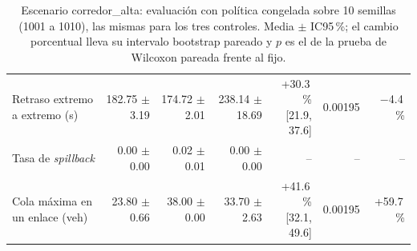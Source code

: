 \begin{table}[H]
\begin{tabular}{lrrrrrr}
Retraso extremo a extremo (s) & 182.75 $\pm$ 3.19 & 174.72 $\pm$ 2.01 & 238.14 $\pm$ 18.69 & \makecell{+30.3\,\%\\{}[21.9, 37.6]} & 0.00195 & $-$4.4\,\% \\
Tasa de \textit{spillback} & 0.00 $\pm$ 0.00 & 0.02 $\pm$ 0.01 & 0.00 $\pm$ 0.00 & -- & -- & -- \\
Cola máxima en un enlace (veh) & 23.80 $\pm$ 0.66 & 38.00 $\pm$ 0.00 & 33.70 $\pm$ 2.63 & \makecell{+41.6\,\%\\{}[32.1, 49.6]} & 0.00195 & +59.7\,\% \\
\bottomrule
\end{tabular}
\caption[Escenario corredor\_alta: evaluación con política congelada]{Escenario corredor\_alta: evaluación con política congelada sobre 10 semillas (1001 a 1010), las mismas para los tres controles. Media $\pm$ IC95\,\%; el cambio porcentual lleva su intervalo bootstrap pareado y $p$ es el de la prueba de Wilcoxon pareada frente al fijo.}
\label{tab:corredor_alta-evaluacion}
\end{table}
